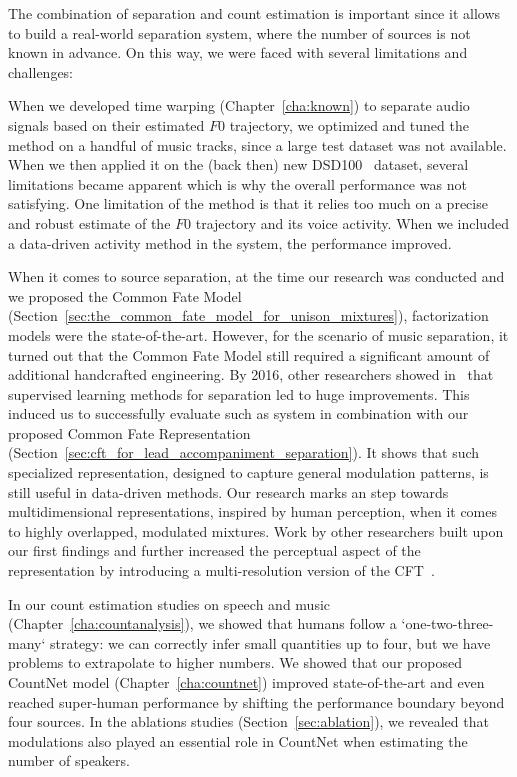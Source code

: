 The combination of separation and count estimation is important since it allows to build a real-world separation system, where the number of sources is not known in advance.
On this way, we were faced with several limitations and challenges:
\par
When we developed time warping (Chapter~\ref{cha:known}) to separate audio signals based on their estimated \(F0\) trajectory, we optimized and tuned the method on a handful of music tracks, since a large test dataset was not available. When we then applied it on the (back then) new DSD100~\cite{liutkus17} dataset, several limitations became apparent which is why the overall performance was not satisfying. One limitation of the method is that it relies too much on a precise and robust estimate of the \(F0\) trajectory and its voice activity. When we included a data-driven activity method in the system, the performance improved.
\par
When it comes to source separation, at the time our research was conducted and we proposed the Common Fate Model (Section~\ref{sec:the_common_fate_model_for_unison_mixtures}), factorization models were the state-of-the-art.
However, for the scenario of music separation, it turned out that the Common Fate Model still required a significant amount of additional handcrafted engineering.
By 2016, other researchers showed in~\cite{uhlich15, nugraha162} that supervised learning methods for separation led to huge improvements. This induced us to successfully evaluate such as system in combination with our proposed Common Fate Representation (Section~\ref{sec:cft_for_lead_accompaniment_separation}).
It shows that such specialized representation, designed to capture general modulation patterns, is still useful in data-driven methods.
Our research marks an step towards multidimensional representations, inspired by human perception, when it comes to highly overlapped, modulated mixtures. Work by other researchers built upon our first findings and further increased the perceptual aspect of the representation by introducing a multi-resolution version of the CFT~\cite{seetharaman17, pishdadian18}.
\par
In our count estimation studies on speech and music (Chapter~\ref{cha:countanalysis}), we showed that humans follow a `one-two-three-many` strategy: we can correctly infer small quantities up to four, but we have problems to extrapolate to higher numbers.
We showed that our proposed CountNet model (Chapter~\ref{cha:countnet}) improved state-of-the-art and even reached super-human performance by shifting the performance boundary beyond four sources. In the ablations studies (Section~\ref{sec:ablation}), we revealed that modulations also played an essential role in CountNet when estimating the number of speakers.
